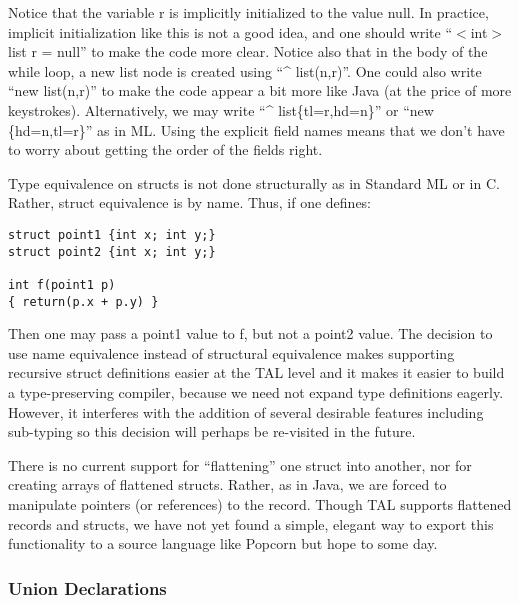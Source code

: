 \documentclass[titlepage,10pt]{article}
\begin{document}
Notice that the variable r is implicitly initialized to the value null.
In practice, implicit initialization like this is not a good idea, and
one should write ``$<$int$>$list r = null'' to make the code more clear.
Notice also that in the body of the while loop, a new list node is
created using ``\^{} list(n,r)''.  One could also write ``new list(n,r)''
to make the code appear a bit more like Java (at the price of more
keystrokes).  Alternatively, we may write ``\^{} list\{tl=r,hd=n\}'' or
``new \{hd=n,tl=r\}'' as in ML.  Using the explicit field names means
that we don't have to worry about getting the order of the fields right.

Type equivalence on structs is not done structurally as in Standard ML
or in C.  Rather, struct equivalence is by name.  Thus, if one defines:


\begin{verbatim}
struct point1 {int x; int y;}
struct point2 {int x; int y;}

int f(point1 p) 
{ return(p.x + p.y) }
\end{verbatim}

Then one may pass a point1 value to f, but not a point2 value.  The
decision to use name equivalence instead of structural equivalence makes
supporting recursive struct definitions easier at the TAL level and it
makes it easier to build a type-preserving compiler, because we need not
expand type definitions eagerly.   However, it interferes with the
addition of several desirable features including sub-typing so this
decision will perhaps be re-visited in the future.

There is no current support for ``flattening'' one struct into another,
nor for creating arrays of flattened structs.  Rather, as in Java,  we
are forced to manipulate pointers (or references) to the record.  Though
TAL supports flattened records and structs, we have not yet found a
simple, elegant way to export this functionality to a source language
like Popcorn but hope to some day.

\subsubsection{Union Declarations}
\end{document}
